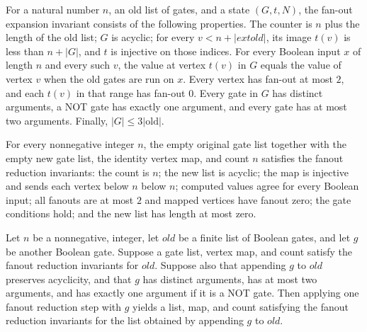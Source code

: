 \begin{definition}
\label{BoolCircuit.FoInv}
\leanok
{}
For a natural number $n$, an old list of gates, and a state $(G,t,N)$, the fan-out
expansion invariant consists of the following properties. The counter is $n$ plus the
length of the old list; $G$ is acyclic; for every $v<n+|	ext{old}|$, its image $t(v)$ is
less than $n+|G|$, and $t$ is injective on those indices. For every Boolean input $x$ of
length $n$ and every such $v$, the value at vertex $t(v)$ in $G$ equals the value of
vertex $v$ when the old gates are run on $x$. Every vertex has fan-out at most $2$, and
each $t(v)$ in that range has fan-out $0$. Every gate in $G$ has distinct arguments, a
NOT gate has exactly one argument, and every gate has at most two arguments. Finally,
$|G|\le 3|\text{old}|$.
\end{definition}

\begin{theorem}
\label{BoolCircuit.foInv_nil}
\leanok
{}
For every nonnegative integer $n$, the empty original gate list together with the empty
new gate list, the identity vertex map, and count $n$ satisfies the fanout reduction
invariants: the count is $n$; the new list is acyclic; the map is injective and sends
each vertex below $n$ below $n$; computed values agree for every Boolean input; all
fanouts are at most $2$ and mapped vertices have fanout zero; the gate conditions hold;
and the new list has length at most zero.
\end{theorem}

\begin{theorem}
\label{BoolCircuit.foInv_step}
\leanok
{}
Let $n$ be a nonnegative, integer, let $old$ be a finite list of Boolean gates, and let
$g$ be another Boolean gate. Suppose a gate list, vertex map, and count satisfy the
fanout reduction invariants for $old$. Suppose also that appending $g$ to $old$
preserves acyclicity, and that $g$ has distinct arguments, has at most two arguments,
and has exactly one argument if it is a NOT gate. Then applying one fanout reduction
step with $g$ yields a list, map, and count satisfying the fanout reduction invariants
for the list obtained by appending $g$ to $old$.
\end{theorem}

